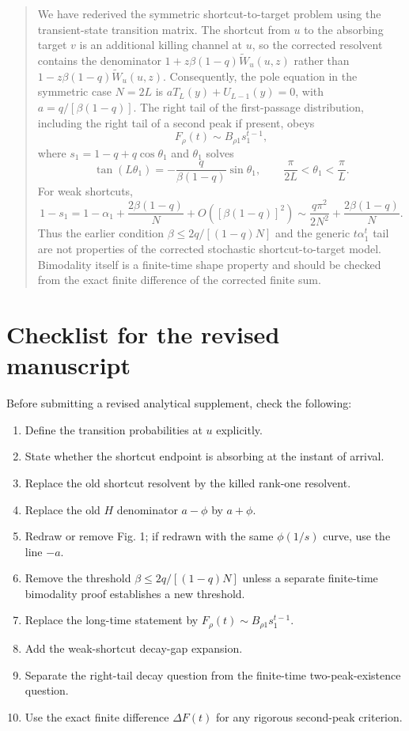 \documentclass[11pt]{article}
\newcommand{\wt}{\widetilde}
\begin{document}
\begin{quote}
We have rederived the symmetric shortcut-to-target problem using the transient-state transition
matrix.  The shortcut from $u$ to the absorbing target $v$ is an additional killing channel at $u$,
so the corrected resolvent contains the denominator $1+z\beta(1-q)\wt W_u(u,z)$ rather than
$1-z\beta(1-q)\wt W_u(u,z)$.  Consequently, the pole equation in the symmetric case $N=2L$ is
$aT_L(y)+U_{L-1}(y)=0$, with $a=q/[\beta(1-q)]$.  The right tail of the first-passage distribution,
including the right tail of a second peak if present, obeys
\begin{equation}
  F_\rho(t)\sim B_{\rho1}s_1^{t-1},
\end{equation}
where $s_1=1-q+q\cos\theta_1$ and $\theta_1$ solves
\begin{equation}
  \tan(L\theta_1)=-\frac{q}{\beta(1-q)}\sin\theta_1,
  \qquad
  \frac{\pi}{2L}<\theta_1<\frac{\pi}{L}.
\end{equation}
For weak shortcuts,
\begin{equation}
  1-s_1=1-\alpha_1+\frac{2\beta(1-q)}{N}+O([\beta(1-q)]^2)
  \sim \frac{q\pi^2}{2N^2}+\frac{2\beta(1-q)}{N}.
\end{equation}
Thus the earlier condition $\beta\le 2q/[(1-q)N]$ and the generic $t\alpha_1^t$ tail are not
properties of the corrected stochastic shortcut-to-target model.  Bimodality itself is a finite-time
shape property and should be checked from the exact finite difference of the corrected finite sum.
\end{quote}

\section{Checklist for the revised manuscript}

Before submitting a revised analytical supplement, check the following:
\begin{enumerate}
  \item Define the transition probabilities at $u$ explicitly.
  \item State whether the shortcut endpoint is absorbing at the instant of arrival.
  \item Replace the old shortcut resolvent by the killed rank-one resolvent.
  \item Replace the old $H$ denominator $a-\phi$ by $a+\phi$.
  \item Redraw or remove Fig. 1; if redrawn with the same $\phi(1/s)$ curve, use the line $-a$.
  \item Remove the threshold $\beta\le 2q/[(1-q)N]$ unless a separate finite-time bimodality proof
  establishes a new threshold.
  \item Replace the long-time statement by $F_\rho(t)\sim B_{\rho1}s_1^{t-1}$.
  \item Add the weak-shortcut decay-gap expansion.
  \item Separate the right-tail decay question from the finite-time two-peak-existence question.
  \item Use the exact finite difference $\Delta F(t)$ for any rigorous second-peak criterion.
\end{enumerate}
\end{document}
